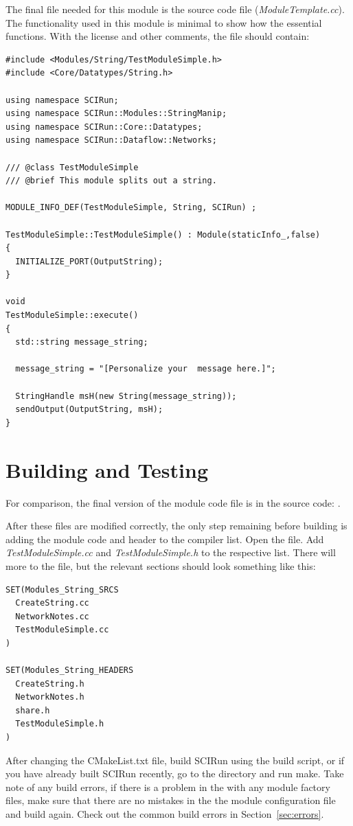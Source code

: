 \documentclass[fleqn,11pt,openany]{book}
\begin{document}
The final file needed for this module is the source code file (\emph{ModuleTemplate.cc}).
The functionality used in this module is minimal to show how the essential functions.  
With the license and other comments, the file should contain:
\begin{verbatim}
#include <Modules/String/TestModuleSimple.h>
#include <Core/Datatypes/String.h>

using namespace SCIRun;
using namespace SCIRun::Modules::StringManip;
using namespace SCIRun::Core::Datatypes;
using namespace SCIRun::Dataflow::Networks;

/// @class TestModuleSimple
/// @brief This module splits out a string. 

MODULE_INFO_DEF(TestModuleSimple, String, SCIRun) ;

TestModuleSimple::TestModuleSimple() : Module(staticInfo_,false)
{
  INITIALIZE_PORT(OutputString);
}

void
TestModuleSimple::execute()
{  
  std::string message_string;
  
  message_string = "[Personalize your  message here.]";
  
  StringHandle msH(new String(message_string));
  sendOutput(OutputString, msH);
}
\end{verbatim}

\section{Building and Testing}
\label{sec:testing}

For comparison, the final version of the module code file is in the source code: \emph{}.

After these files are modified correctly,  the only step remaining before building is adding the module code and header to the compiler list.  
Open the \emph{} file.  
Add \emph{TestModuleSimple.cc} and \emph{TestModuleSimple.h} to the respective list.
There will more to the file, but the relevant sections should look something like this:
\begin{verbatim}
SET(Modules_String_SRCS
  CreateString.cc
  NetworkNotes.cc
  TestModuleSimple.cc
)

SET(Modules_String_HEADERS
  CreateString.h
  NetworkNotes.h
  share.h
  TestModuleSimple.h
)
\end{verbatim}

After changing the CMakeList.txt file, build SCIRun using the build script, or if you have already built SCIRun recently, go to the \emph{} directory and run make.  
Take note of any build errors, if there is a problem in the with any module factory files, make sure that there are no mistakes in the the module configuration file and build again.  
Check out the common build errors in Section~\ref{sec:errors}.
\end{document}
